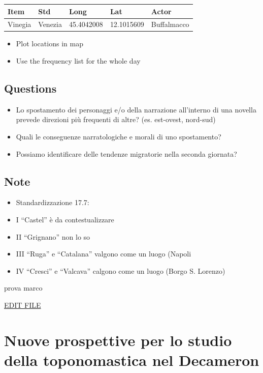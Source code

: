 \begin{longtable}[]{@{}lllll@{}}
\toprule
Item & Std & Long & Lat & Actor\tabularnewline
\midrule
\endhead
Vinegia & Venezia & 45.4042008 & 12.1015609 & Buffalmacco\tabularnewline
\bottomrule
\end{longtable}

\begin{itemize}
\tightlist
\item
  Plot locations in map
\item
  Use the frequency list for the whole day
\end{itemize}

\subsection{Questions}\label{questions}

\begin{itemize}
\tightlist
\item
  Lo spostamento dei personaggi e/o della narrazione all'interno di una
  novella prevede direzioni più frequenti di altre? (es. est-ovest,
  nord-sud)
\item
  Quali le conseguenze narratologiche e morali di uno spostamento?
\item
  Possiamo identificare delle tendenze migratorie nella seconda
  giornata?
\end{itemize}

\subsection{Note}\label{note}

\begin{itemize}
\item
  Standardizzazione 17.7:
\item
  I ``Castel'' è da contestualizzare
\item
  II ``Grignano'' non lo so
\item
  III ``Ruga'' e ``Catalana'' valgono come un luogo (Napoli
\item
  IV ``Cresci'' e ``Valcava'' calgono come un luogo (Borgo S. Lorenzo)
\end{itemize}

prova marco

\href{https://github.com/olablit2/geoBoccaccio/edit/master/docs/2018-article/index.md}{EDIT
FILE}

\section{Nuove prospettive per lo studio della toponomastica nel
Decameron}\label{nuove-prospettive-per-lo-studio-della-toponomastica-nel-decameron}

